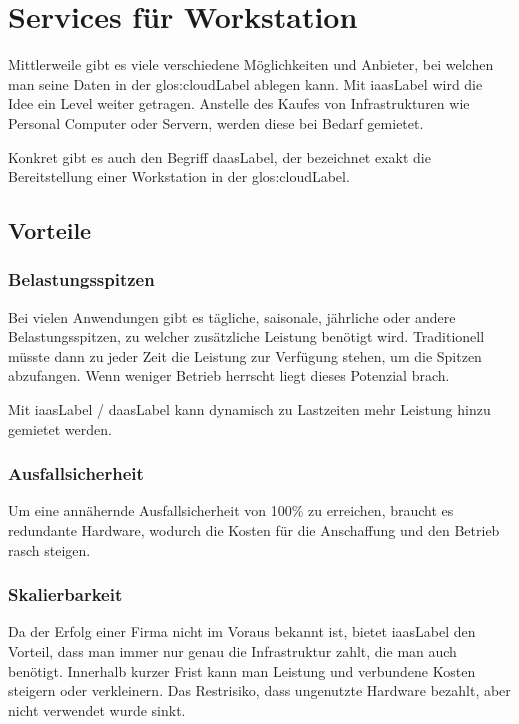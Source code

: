 \section{Services für Workstation}
Mittlerweile gibt es viele verschiedene Möglichkeiten und Anbieter, bei welchen man seine Daten in der \Gls{glos:cloudLabel} ablegen kann. Mit \Gls{iaasLabel} wird die Idee ein Level weiter getragen.
Anstelle des Kaufes von Infrastrukturen wie Personal Computer oder Servern, werden diese bei Bedarf gemietet.

Konkret gibt es auch den Begriff \Gls{daasLabel}, der bezeichnet exakt die Bereitstellung einer Workstation in der \Gls{glos:cloudLabel}.

\subsection{Vorteile}
\label{sec:Vorteile}
\subsubsection{Belastungsspitzen}
Bei vielen Anwendungen gibt es tägliche, saisonale, jährliche oder andere Belastungsspitzen, zu welcher zusätzliche Leistung benötigt wird.
Traditionell müsste dann zu jeder Zeit die Leistung zur Verfügung stehen, um die Spitzen abzufangen. Wenn weniger Betrieb herrscht liegt dieses Potenzial brach.

Mit \Gls{iaasLabel} / \Gls{daasLabel} kann dynamisch zu Lastzeiten mehr Leistung hinzu gemietet werden.



\subsubsection{Ausfallsicherheit}
Um eine annähernde Ausfallsicherheit von 100\% zu erreichen, braucht es redundante Hardware, wodurch die Kosten für die Anschaffung und den Betrieb rasch steigen.

\subsubsection{Skalierbarkeit}
Da der Erfolg einer Firma nicht im Voraus bekannt ist, bietet \Gls{iaasLabel} den Vorteil, dass man immer nur genau die Infrastruktur zahlt, die man auch benötigt.
Innerhalb kurzer Frist kann man Leistung und verbundene Kosten steigern oder verkleinern.
Das Restrisiko, dass ungenutzte Hardware bezahlt, aber nicht verwendet wurde sinkt.

